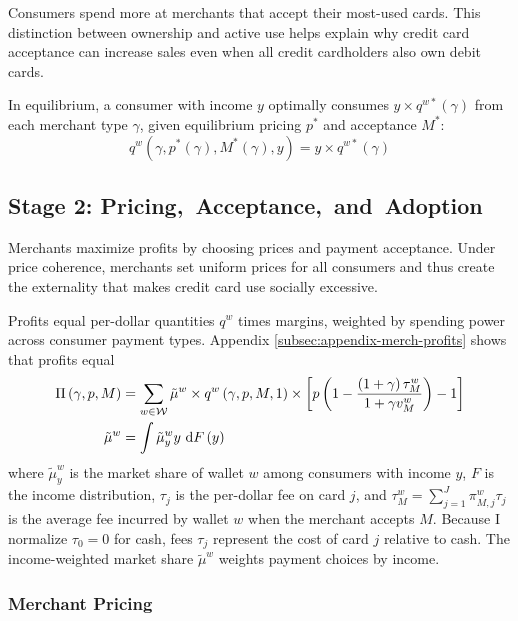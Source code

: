 \documentclass[main.tex]{subfiles}
\begin{document}
Consumers spend more at merchants that accept their most-used cards.
This distinction between ownership and active use helps explain why credit card acceptance can increase sales even when all credit cardholders also own debit cards.

In equilibrium, a consumer with income $y$ optimally consumes $y \times q^{w*}\left(\gamma\right)$ from each merchant type $\gamma$, given equilibrium pricing $p^{*}$ and acceptance $M^{*}$:
\begin{equation}
  q^{w}\left(\gamma,p^{*}\left(\gamma\right),M^{*}\left(\gamma\right),y\right)=y \times q^{w*}\left(\gamma\right)\label{eq:optimal-consumption}
\end{equation}

\subsection{Stage 2: Pricing,~Acceptance,~and~Adoption}

Merchants maximize profits by choosing prices and payment acceptance.
Under price coherence, merchants set uniform prices for all consumers and thus create the externality that makes credit card use socially excessive.

Profits equal per-dollar quantities $q^w$ times margins, weighted by spending power across consumer payment types.
Appendix \ref{subsec:appendix-merch-profits} shows that profits equal
\begin{align}
\Pi\left(\gamma,p,M\right) & =\sum_{w\in\mathcal{W}}\tilde{\mu}^{w}\times q^{w}\left(\gamma,p,M,1\right)\times\left[p\left(1-\frac{\left(1+\gamma\right)\tau_{M}^{w}}{1+\gamma v_{M}^{w}}\right)-1\right]\label{eq:merch-profit-defn}\\
\tilde{\mu}^{w} & =\int\tilde{\mu}_{y}^{w}y\mbox{ d} F\left(y\right)\nonumber 
\end{align}
where $\tilde{\mu}^w_y$ is the market share of wallet $w$ among consumers with income $y$, $F$ is the income distribution, $\tau_j$ is the per-dollar fee on card $j$, and $\tau^w_M=\sum_{j=1}^{J} \pi^w_{M,j} \tau_j$ is the average fee incurred by wallet $w$ when the merchant accepts $M$.
Because I normalize $\tau_0 = 0$ for cash, fees $\tau_j$ represent the cost of card $j$ relative to cash.
The income-weighted market share $\tilde{\mu}^w$ weights payment choices by income.

\subsubsection{Merchant Pricing}
\label{subsubsec:merch-pricing}
\end{document}
